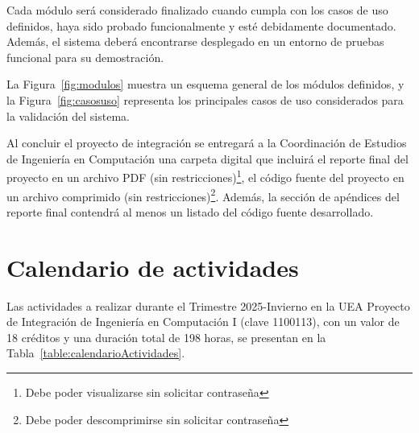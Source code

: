 	Cada módulo será considerado finalizado cuando cumpla con los casos de uso definidos, haya sido probado funcionalmente y esté debidamente documentado. Además, el sistema deberá encontrarse desplegado en un entorno de pruebas funcional para su demostración.
	
	La Figura~\ref{fig:modulos} muestra un esquema general de los módulos definidos, y la Figura~\ref{fig:casosuso} representa los principales casos de uso considerados para la validación del sistema.
	
	\vspace{0.5cm}
	
	Al concluir el proyecto de integración se entregará a la Coordinación de Estudios de Ingeniería en Computación una carpeta digital que incluirá el reporte final del proyecto en un archivo PDF (sin restricciones)\footnote{Debe poder visualizarse sin solicitar contraseña}, el código fuente del proyecto en un archivo comprimido (sin restricciones)\footnote{Debe poder descomprimirse sin solicitar contraseña}. Además, la sección de apéndices del reporte final contendrá al menos un listado del código fuente desarrollado.


	\section{Calendario de actividades}

Las actividades a realizar durante el Trimestre 2025-Invierno en la UEA Proyecto de Integración de Ingeniería en Computación I (clave 1100113), con un valor de 18 créditos y una duración total de 198 horas, se presentan en la Tabla~\ref{table:calendarioActividades}.

